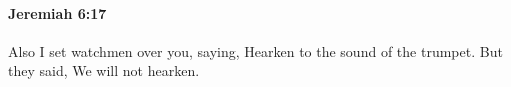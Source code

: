 
		\paragraph{Jeremiah 6:17} %
			\label{JEREMIAH-6-17}

			Also I set watchmen over you, saying, Hearken to the sound of the trumpet. But they said, We will not hearken.


